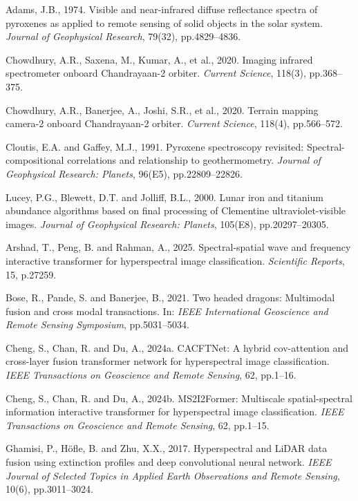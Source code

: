 \documentclass[pdflatex,sn-mathphys-num]{sn-jnl}
\begin{document}
\begin{thebibliography}{}

Adams, J.B., 1974.
Visible and near-infrared diffuse reflectance spectra of pyroxenes as applied to remote sensing of solid objects in the solar system.
\textit{Journal of Geophysical Research}, 79(32), pp.4829--4836.

Chowdhury, A.R., Saxena, M., Kumar, A., et al., 2020.
Imaging infrared spectrometer onboard Chandrayaan-2 orbiter.
\textit{Current Science}, 118(3), pp.368--375.

Chowdhury, A.R., Banerjee, A., Joshi, S.R., et al., 2020.
Terrain mapping camera-2 onboard Chandrayaan-2 orbiter.
\textit{Current Science}, 118(4), pp.566--572.

Cloutis, E.A. and Gaffey, M.J., 1991.
Pyroxene spectroscopy revisited: Spectral-compositional correlations and relationship to geothermometry.
\textit{Journal of Geophysical Research: Planets}, 96(E5), pp.22809--22826.

Lucey, P.G., Blewett, D.T. and Jolliff, B.L., 2000.
Lunar iron and titanium abundance algorithms based on final processing of Clementine ultraviolet-visible images.
\textit{Journal of Geophysical Research: Planets}, 105(E8), pp.20297--20305.

Arshad, T., Peng, B. and Rahman, A., 2025.
Spectral-spatial wave and frequency interactive transformer for hyperspectral image classification.
\textit{Scientific Reports}, 15, p.27259.

Bose, R., Pande, S. and Banerjee, B., 2021.
Two headed dragons: Multimodal fusion and cross modal transactions.
In: \textit{IEEE International Geoscience and Remote Sensing Symposium}, pp.5031--5034.

Cheng, S., Chan, R. and Du, A., 2024a.
CACFTNet: A hybrid cov-attention and cross-layer fusion transformer network for hyperspectral image classification.
\textit{IEEE Transactions on Geoscience and Remote Sensing}, 62, pp.1--16.

Cheng, S., Chan, R. and Du, A., 2024b.
MS2I2Former: Multiscale spatial-spectral information interactive transformer for hyperspectral image classification.
\textit{IEEE Transactions on Geoscience and Remote Sensing}, 62, pp.1--15.

Ghamisi, P., H\"{o}fle, B. and Zhu, X.X., 2017.
Hyperspectral and LiDAR data fusion using extinction profiles and deep convolutional neural network.
\textit{IEEE Journal of Selected Topics in Applied Earth Observations and Remote Sensing}, 10(6), pp.3011--3024.


\end{thebibliography}
\end{document}
